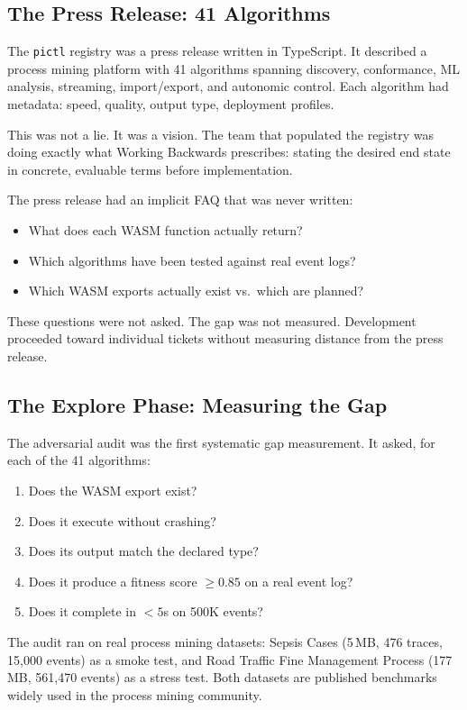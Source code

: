 \documentclass[11pt,a4paper]{article}
\newcommand{\code}[1]{\texttt{#1}}
\begin{document}
\subsection{The Press Release: 41 Algorithms}

The \code{pictl} registry was a press release written in TypeScript.  It
described a process mining platform with 41 algorithms spanning discovery,
conformance, ML analysis, streaming, import/export, and autonomic control.
Each algorithm had metadata: speed, quality, output type, deployment profiles.

This was not a lie.  It was a vision.  The team that populated the registry
was doing exactly what Working Backwards prescribes: stating the desired end
state in concrete, evaluable terms before implementation.

The press release had an implicit FAQ that was never written:
\begin{itemize}
  \item What does each WASM function actually return?
  \item Which algorithms have been tested against real event logs?
  \item Which WASM exports actually exist vs.\ which are planned?
\end{itemize}

These questions were not asked.  The gap was not measured.  Development
proceeded toward individual tickets without measuring distance from the press
release.

\subsection{The Explore Phase: Measuring the Gap}

The adversarial audit was the first systematic gap measurement.  It asked, for
each of the 41 algorithms:

\begin{enumerate}
  \item Does the WASM export exist?
  \item Does it execute without crashing?
  \item Does its output match the declared type?
  \item Does it produce a fitness score $\geq 0.85$ on a real event log?
  \item Does it complete in $< 5$s on 500K events?
\end{enumerate}

The audit ran on real process mining datasets: Sepsis Cases (5\,MB, 476 traces, 15,000 events)
as a smoke test, and Road Traffic Fine Management Process (177\,MB, 561,470 events) as a stress
test.  Both datasets are published benchmarks widely used in the process mining community.
\end{document}
